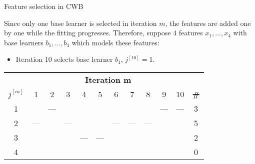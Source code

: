 \begin{vbframe}{Feature selection in CWB}

Since only one base learner is selected in iteration $m$, the features are added one by one while the fitting progresses. Therefore, suppose 4 features $x_1, \dots, x_4$ with base learners $b_1, \dots, b_4$ which models these features:
\begin{itemize}
    \item 
        Iteration 10 selects base learner $b_{1}$, $j^{[10]} = 1$.
\end{itemize}

\begin{table}
  \centering
  \scriptsize
    \begin{tabular}{c|cccccccccc|c}
    \multicolumn{1}{c|}{} & \multicolumn{10}{c}{\bfseries Iteration m} \\ 
    $j^{[m]}$ & 1 & 2 & 3 & 4 & 5 & 6 & 7 & 8 & 9 & 10  & {\bfseries \#} \\ \hline\hline
    1 &     & --- &     &     &     &     &     &     & --- & --- & 3\\
    2 & --- &     & --- &     &     & --- & --- & --- &     &     & 5\\
    3 &     &     &     & --- & --- &     &     &     &     &     & 2\\
    4 &     &     &     &     &     &     &     &     &     &     & 0 
    \end{tabular}
    \addtocounter{framenumber}{-1}
\end{table}

\end{vbframe}

